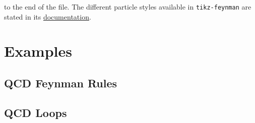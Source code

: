 \documentclass[12pt]{article}
\begin{document}
to the end of the file. The different particle styles available in \texttt{tikz-feynman} are stated in its \href{https://ctan.org/pkg/tikz-feynman}{documentation}.

\newpage 

\section{Examples}


\subsection{QCD Feynman Rules}

\begin{center}
	














\end{center}


\newpage


\subsection{QCD Loops}


\begin{center}
	
















\end{center}
\end{document}
